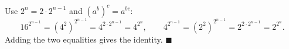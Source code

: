 Use $2^n=2\cdot2^{n-1}$ and $(a^b)^c=a^{bc}$:
\[
16^{2^{n-1}}=\left(4^2\right)^{2^{n-1}}=4^{2\cdot2^{n-1}}=4^{2^n},\qquad 4^{2^{n-1}}=\left(2^2\right)^{2^{n-1}}=2^{2\cdot2^{n-1}}=2^{2^n}.
\]
Adding the two equalities gives the identity. $\blacksquare$
